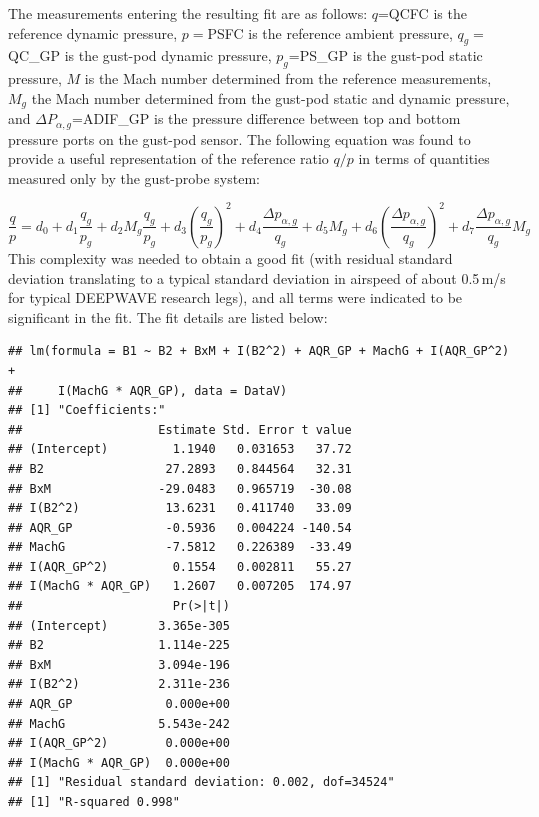 \documentclass[12pt,twoside,english]{article}\usepackage[]{graphicx}\usepackage[]{color}
\makeatletter
\newenvironment{kframe}{%
 \def\at@end@of@kframe{}%
 \ifinner\ifhmode%
  \def\at@end@of@kframe{\end{minipage}}%
  \begin{minipage}{\columnwidth}%
 \fi\fi%
 \def\FrameCommand##1{\hskip\@totalleftmargin \hskip-\fboxsep
 \colorbox{shadecolor}{##1}\hskip-\fboxsep
     \hskip-\linewidth \hskip-\@totalleftmargin \hskip\columnwidth}%
 \MakeFramed {\advance\hsize-\width
   \@totalleftmargin\z@ \linewidth\hsize
   \@setminipage}}%
 {\par\unskip\endMakeFramed%
 \at@end@of@kframe}
\newenvironment{knitrout}{}{} %
\let\OrgIndex\index
\renewcommand*{\index}[1]{\OrgIndex{#1}}
\makeatother
\begin{document}
The measurements entering the resulting fit are as follows: $q$=QCFC is the reference dynamic pressure, $p=$PSFC is the reference ambient pressure, $q_{g}=$QC\_GP is the gust-pod dynamic pressure, $p_{g}$=PS\_GP is the gust-pod static pressure, $M$ is the Mach number determined from the reference measurements, $M_{g}$ the Mach number determined from the gust-pod static and dynamic pressure, and $\Delta P_{\alpha,g}$=ADIF\_GP is the pressure difference between top and bottom pressure ports on the gust-pod sensor. The following equation was found to provide a useful representation of the reference ratio $q/p$ in terms of quantities measured only by the gust-probe system: 

\begin{equation}
\frac{q}{p}=d_{0}+d_{1}\frac{q_{g}}{p_{g}}+d_{2}M_{g}\frac{q_{g}}{p_{g}}+d{}_{3}\left(\frac{q_{g}}{p_{g}}\right)^{2}+d_{4}\frac{\Delta p_{\alpha,g}}{q_{g}}+d_{5}M_{g}+d_{6}\left(\frac{\Delta p_{\alpha,g}}{q_{g}}\right)^{2}+d_{7}\frac{\Delta p_{\alpha,g}}{q_{g}}M_{g}\label{eq:TASfit}
\end{equation}
This complexity was needed to obtain a good fit (with residual standard deviation translating to a typical standard deviation in airspeed of about 0.5\,m/s for typical DEEPWAVE research legs), and all terms were indicated to be significant in the fit. The fit details are listed below: 

\begin{knitrout}\footnotesize
{}\color{fgcolor}\begin{kframe}
\begin{verbatim}
## lm(formula = B1 ~ B2 + BxM + I(B2^2) + AQR_GP + MachG + I(AQR_GP^2) + 
##     I(MachG * AQR_GP), data = DataV)
## [1] "Coefficients:"
##                   Estimate Std. Error t value
## (Intercept)         1.1940   0.031653   37.72
## B2                 27.2893   0.844564   32.31
## BxM               -29.0483   0.965719  -30.08
## I(B2^2)            13.6231   0.411740   33.09
## AQR_GP             -0.5936   0.004224 -140.54
## MachG              -7.5812   0.226389  -33.49
## I(AQR_GP^2)         0.1554   0.002811   55.27
## I(MachG * AQR_GP)   1.2607   0.007205  174.97
##                     Pr(>|t|)
## (Intercept)       3.365e-305
## B2                1.114e-225
## BxM               3.094e-196
## I(B2^2)           2.311e-236
## AQR_GP             0.000e+00
## MachG             5.543e-242
## I(AQR_GP^2)        0.000e+00
## I(MachG * AQR_GP)  0.000e+00
## [1] "Residual standard deviation: 0.002, dof=34524"
## [1] "R-squared 0.998"
\end{verbatim}
\end{kframe}
\end{knitrout}
\end{document}
